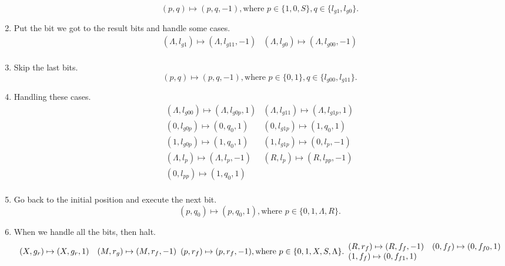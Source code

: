 \documentclass[a4papper]{article}
\theoremstyle{neosn}
\begin{document}
\begin{enumerate}
\[            (p, q) \mapsto (p, q, -1), \text{where } p \in \{1,0,S\}, q \in \{l_{g1}, l_{g0}\}.
        \]
        \item Put the bit we got to the result bits and handle some cases.
        \[
            \begin{array}{ll}
                (\Lambda, l_{g1}) \mapsto (\Lambda, l_{g11}, -1) & (\Lambda, l_{g0}) \mapsto (\Lambda, l_{g00}, -1) \\
            \end{array}
        \]
        \item Skip the last bits.
        \[
            (p,q) \mapsto (p, q, -1), \text{where } p \in \{0,1\}, q \in \{l_{g00}, l_{g11}\}.
        \]
        \item Handling these cases.
        \[
            \begin{array}{ll}
                (\Lambda, l_{g00}) \mapsto (\Lambda, l_{g0p}, 1) & (\Lambda, l_{g11}) \mapsto (\Lambda, l_{g1p}, 1) \\
                (0, l_{g0p}) \mapsto (0, q_{0}, 1) & (0, l_{g1p}) \mapsto (1, q_{0}, 1) \\
                (1, l_{g0p}) \mapsto (1, q_{0}, 1) & (1, l_{g1p}) \mapsto (0, l_{p}, -1) \\
                (\Lambda, l_{p}) \mapsto (\Lambda, l_{p}, -1) & (R, l_{p}) \mapsto (R, l_{pp}, -1) \\
                (0, l_{pp}) \mapsto (1, q_{0}, 1) & \\
            \end{array}
        \]
        \item Go back to the initial position and execute the next bit.
        \[
            (p, q_0) \mapsto (p ,q_0, 1), \text{where } p \in \{0,1,\Lambda, R\}.
        \]
        \item When we handle all the bits, then halt.
        \[
            \begin{array}{ll}
                (X, g_{r}) \mapsto (X, g_{r}, 1) & (M, r_{g}) \mapsto (M, r_{f}, -1) \\
            \end{array} \\

            (p, r_f) \mapsto (p, r_f, -1), \text{where } p \in \{0,1,X,S,\Lambda\}.

            \begin{array}{ll}
                (R, r_{f}) \mapsto (R, f_{f}, -1) & (0, f_{f}) \mapsto (0, f_{f0}, 1) \\
                (1, f_{f}) \mapsto (0, f_{f1}, 1) & \\
            \end{array} \\

\]
\end{enumerate}
\end{document}

